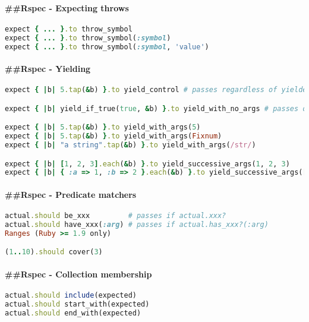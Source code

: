 \documentclass[serif,mathserif]{article}
\begin{document}
\paragraph{\#\#Rspec - Expecting throws}
\begin{lstlisting}[language=ruby]
expect { ... }.to throw_symbol
expect { ... }.to throw_symbol(:symbol)
expect { ... }.to throw_symbol(:symbol, 'value')
\end{lstlisting}

\paragraph{\#\#Rspec - Yielding}
\begin{lstlisting}[language=ruby]
expect { |b| 5.tap(&b) }.to yield_control # passes regardless of yielded args

expect { |b| yield_if_true(true, &b) }.to yield_with_no_args # passes only if no args are yielded

expect { |b| 5.tap(&b) }.to yield_with_args(5)
expect { |b| 5.tap(&b) }.to yield_with_args(Fixnum)
expect { |b| "a string".tap(&b) }.to yield_with_args(/str/)

expect { |b| [1, 2, 3].each(&b) }.to yield_successive_args(1, 2, 3)
expect { |b| { :a => 1, :b => 2 }.each(&b) }.to yield_successive_args([:a, 1], [:b, 2])
\end{lstlisting}

\paragraph{\#\#Rspec - Predicate matchers}
\begin{lstlisting}[language=ruby]
actual.should be_xxx         # passes if actual.xxx?
actual.should have_xxx(:arg) # passes if actual.has_xxx?(:arg)
Ranges (Ruby >= 1.9 only)

(1..10).should cover(3)

\end{lstlisting}



\paragraph{\#\#Rspec - Collection membership}
\begin{lstlisting}[language=ruby]
actual.should include(expected)
actual.should start_with(expected)
actual.should end_with(expected) 
\end{lstlisting}
\end{document}

